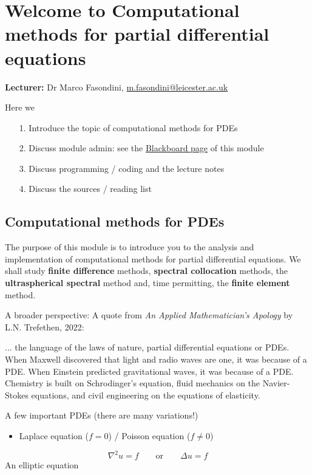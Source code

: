 \documentclass[12pt,a4paper]{article}
\begin{document}
\section{Welcome to Computational methods for partial differential equations}
\textbf{Lecturer:} Dr Marco Fasondini, \href{mailto:m.fasondini@leicester.ac.uk}{m.fasondini@leicester.ac.uk}

Here we

\begin{itemize}
\item[1. ] Introduce the topic of computational methods for PDEs


\item[2. ] Discuss module admin: see the \href{https://blackboard.le.ac.uk/}{Blackboard page} of this module


\item[3. ] Discuss programming / coding and the lecture notes


\item[4. ] Discuss the sources / reading list

\end{itemize}
\subsection{Computational methods for PDEs}
The purpose of this module is to introduce you to the analysis and implementation of computational methods for partial differential equations.  We shall study \textbf{finite difference} methods, \textbf{spectral collocation} methods, the \textbf{ultraspherical spectral} method and, time permitting, the \textbf{finite element} method.  

A broader perspective: A quote from \emph{An Applied Mathematician's Apology} by L.N. Trefethen, 2022:

... the language of the laws of nature, partial differential equations or PDEs. When Maxwell discovered that light and radio waves are one, it was because of a PDE. When Einstein predicted gravitational waves, it was because     of a PDE. Chemistry is built on Schrodinger's equation, fluid mechanics on the Navier-Stokes equations, and civil engineering on the equations of elasticity.

A few important PDEs (there are many variations!)

\begin{itemize}
\item Laplace equation ($f = 0$) / Poisson equation ($f \neq 0$) 

\end{itemize}
\[
\nabla^2 u = f   \qquad \text{or} \qquad \Delta u = f
\]
An elliptic equation
\end{document}
